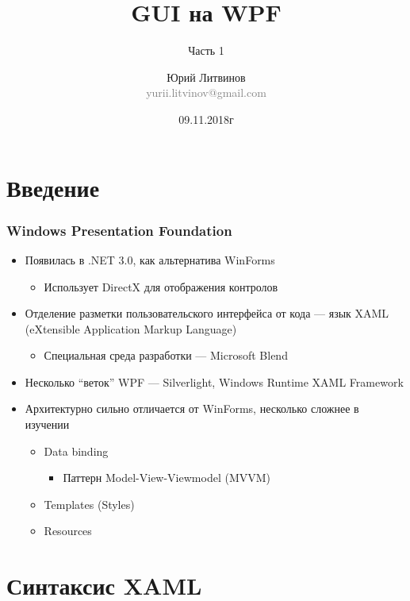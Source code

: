 \documentclass[xetex,mathserif,serif]{beamer}
\title{GUI на WPF}
\subtitle{Часть 1}
\author[Юрий Литвинов]{Юрий Литвинов\\\small{\textcolor{gray}{yurii.litvinov@gmail.com}}}
\date{09.11.2018г}
\begin{document}
	\frame{\titlepage}

	\section{Введение}

	\begin{frame}
		\frametitle{Windows Presentation Foundation}
		\begin{itemize}
			\item Появилась в .NET 3.0, как альтернатива WinForms
			\begin{itemize}
				\item Использует DirectX для отображения контролов
			\end{itemize}
			\item Отделение разметки пользовательского интерфейса от кода --- язык XAML (eXtensible Application Markup Language)
			\begin{itemize}
				\item Специальная среда разработки --- Microsoft Blend
			\end{itemize}
			\item Несколько ``веток'' WPF --- Silverlight, Windows Runtime XAML Framework
			\item Архитектурно сильно отличается от WinForms, несколько сложнее в изучении
			\begin{itemize}
				\item Data binding
				\begin{itemize}
					\item Паттерн Model-View-Viewmodel (MVVM)
				\end{itemize}
				\item Templates (Styles)
				\item Resources
			\end{itemize}
		\end{itemize}
	\end{frame}

	\section{Синтаксис XAML}
\end{document}
